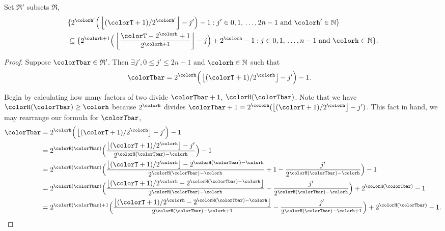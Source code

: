\begin{sublemma}
\label{thm:tilted-subsetr}
Set $\mathfrak{R}'$ subsets $\mathfrak{R}$,
\begin{align*}
&\{
  2^{\colorh'}\Big(\left\lfloor (\colorT + 1) / 2^{\colorh'} \right\rfloor - j'\Big) - 1
  :
  j' \in 0,1,\,\ldots,2n-1
  \text{ and }
  \colorh' \in \mathbb{N}
\}\\
&\subseteq
\{
  2^{\colorh + 1}\Big( \left\lfloor\frac{\colorT - 2^{\colorh} + 1}{2^{\colorh + 1}} \right\rfloor - j\Big) + 2^{\colorh} - 1
  :
  j \in 0,1,\,\ldots,n-1
  \text{ and }
  \colorh \in \mathbb{N}
\}.
\end{align*}

\end{sublemma}
\begin{proof}
Suppose $\colorTbar \in \mathfrak{R}'$.
Then $\exists j',  0 \leq j' \leq 2n - 1$ and $\colorh \in \mathbb{N}$ such that
\begin{align*}
\colorTbar
&= 2^{\colorh}\Big(\left\lfloor (\colorT + 1) / 2^{\colorh} \right\rfloor - j'\Big) - 1.
\end{align*}

Begin by calculating how many factors of two divide $\colorTbar + 1$, $\colorH(\colorTbar)$.
Note that we have $\colorH(\colorTbar) \geq \colorh$ because $2^{\colorh}$ divides $\colorTbar + 1 = 2^{\colorh}(\left\lfloor (\colorT + 1) / 2^{\colorh} \right\rfloor - j')$.
This fact in hand, we may rearrange our formula for $\colorTbar$,
\begin{align*}
\colorTbar
&= 2^{\colorh}\Big(\left\lfloor (\colorT + 1) / 2^{\colorh} \right\rfloor - j'\Big) - 1\\
&= 2^{\colorH(\colorTbar)} \Big(
\frac{\left\lfloor (\colorT + 1) / 2^{\colorh} \right\rfloor - j'}{2^{\colorH(\colorTbar) - \colorh}}
\Big)
- 1\\
&= 2^{\colorH(\colorTbar)} \Big(
\frac{\left\lfloor (\colorT + 1) / 2^{\colorh} \right\rfloor - 2^{\colorH(\colorTbar) - \colorh}}{2^{\colorH(\colorTbar) - \colorh}}
+ 1
- \frac{j'}{2^{\colorH(\colorTbar) - \colorh}}
\Big)
- 1\\
&= 2^{\colorH(\colorTbar)} \Big(
\frac{\left\lfloor (\colorT + 1) / 2^{\colorh} - 2^{\colorH(\colorTbar) - \colorh} \right\rfloor}{2^{\colorH(\colorTbar) - \colorh}}
- \frac{j'}{2^{\colorH(\colorTbar) - \colorh}}
\Big)
+ 2^{\colorH(\colorTbar)}
- 1\\
&= 2^{\colorH(\colorTbar) + 1} \Big(
\frac{\left\lfloor (\colorT + 1)/ 2^{\colorh} - 2^{\colorH(\colorTbar) - \colorh} \right\rfloor}{2^{\colorH(\colorTbar) - \colorh + 1}}
- \frac{j'}{2^{\colorH(\colorTbar) - \colorh + 1}}
\Big)
+ 2^{\colorH(\colorTbar)}
- 1.
\end{align*}


\end{proof}

